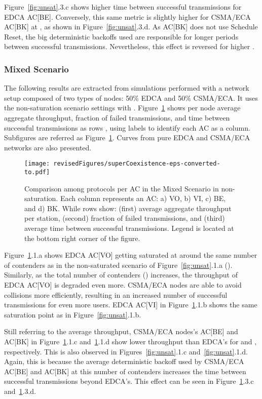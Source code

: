 \documentclass[a4paper]{article}
\begin{document}
Figure~\ref{fig:unsat}.3.c shows higher time between successful transmissions for EDCA AC[BE]. Conversely, this same metric is slightly higher for CSMA/ECA AC[BK] at , as shown in Figure~\ref{fig:unsat}.3.d. As AC[BK] does not use Schedule Reset, the big deterministic backoffs used are responsible for longer periods between successful transmissions. Nevertheless, this effect is reversed for higher .

\subsubsection{Mixed Scenario}\label{mixSection}
The following results are extracted from simulations performed with a network setup composed of two types of nodes: 50\% EDCA and 50\% CSMA/ECA. It uses the non-saturation scenario settings with . Figure~\ref{mix} shows per node average aggregate throughput, fraction of failed transmissions, and time between successful transmissions as rows , using labels  to identify each AC as a column. Subfigures are referred as Figure~\ref{mix}. Curves from pure EDCA and CSMA/ECA networks are also presented.

	\begin{figure}[t]
	\centering
		\texttt{[image: revisedFigures/superCoexistence-eps-converted-to.pdf]}
		\caption{Comparison among protocols per AC in the Mixed Scenario in non-saturation. Each column represents an AC: a) VO, b) VI, c) BE, and d) BK. While rows show: (first) average aggregate throughput per station, (second) fraction of failed transmissions, and (third) average time between successful transmissions. Legend is located at the bottom right corner of the figure.}
		\label{mix}
	\end{figure}

Figure~\ref{mix}.1.a shows EDCA AC[VO] getting saturated at around the same number of contenders as in the non-saturated scenario of Figure~\ref{fig:unsat}.1.a (). Similarly, as the total number of contenders () increases, the throughput of EDCA AC[VO] is degraded even more. CSMA/ECA nodes are able to avoid collisions more efficiently, resulting in an increased number of successful transmissions for even more users. EDCA AC[VI] in Figure~\ref{mix}.1.b shows the same saturation point as in Figure~\ref{fig:unsat}.1.b.

Still referring to the average throughput, CSMA/ECA nodes's AC[BE] and AC[BK] in Figure~\ref{mix}.1.c and~\ref{mix}.1.d show lower throughput than EDCA's for  and , respectively. This is also observed in Figures~\ref{fig:unsat}.1.c and~\ref{fig:unsat}.1.d. Again, this is because the average deterministic backoff used by CSMA/ECA AC[BE] and AC[BK] at this number of contenders increases the time between successful transmissions beyond EDCA's. This effect can be seen in Figure~\ref{mix}.3.c and~\ref{mix}.3.d.
\end{document}
